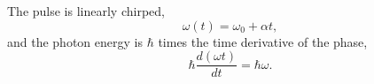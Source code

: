 \documentclass{article}
\begin{document}
The pulse is linearly chirped,
\begin{equation}
\omega(t) = \omega_0 + \alpha t ,
\label{eq:w}
\end{equation}
and the photon energy is $\hbar$ times the time derivative of the phase,
\begin{equation}
\hbar \frac{d(\omega t)}{dt} = \hbar\omega .
\label{eq:chirp}
\end{equation}
\end{document}
